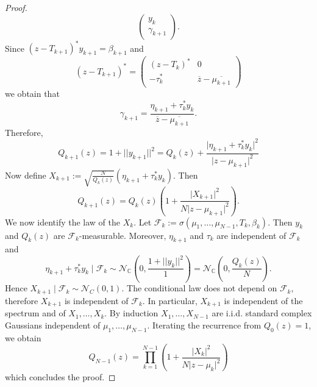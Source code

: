 \documentclass[10pt,a4paper]{amsart}
\newcommand{\C}{\mathbb{C}}
\begin{document}
\begin{proof}
\begin{equation*}
\begin{pmatrix}
        y_k\\
        \gamma_{k+1}
    \end{pmatrix}.
    \end{equation*}
    Since $(z-T_{k+1})^*y_{k+1}=\beta_{k+1}$ and 
    \begin{equation*}
        (z-T_{k+1})^*= \begin{pmatrix}
        (z-T_k)^*&0\\
        -\tau_k^*& \overline{z}-\overline{\mu_{k+1}}
    \end{pmatrix}
    \end{equation*}
    we obtain that 
    \begin{equation*}
        \gamma_{k+1}=\frac{\eta_{k+1}+\tau_k^*y_k}{\overline{z}-\overline{\mu_{k+1}}}.
    \end{equation*}
    Therefore, 
    \begin{equation*}
        Q_{k+1}(z)=1+\lvert \lvert y_{k+1}\lvert \lvert^2=Q_k(z)+ \frac{\lvert \eta_{k+1}+\tau_k^*y_k\lvert^2}{\lvert z-\mu_{k+1}\lvert^2}
    \end{equation*}
    Now define $X_{k+1}:=\sqrt{\frac{N}{Q_k(z)}}(\eta_{k+1}+\tau_k^*y_k).$ Then 
    \begin{equation*}
        Q_{k+1}(z)=Q_k(z)\left(1+ \frac{\lvert X_{k+1}\lvert^2}{N\lvert z-\mu_{k+1}\lvert^2}\right).
    \end{equation*}
    We now identify the law of the $X_k$. Let $\mathcal{F}_k:=\sigma(\mu_1,\ldots,\mu_{N-1},T_k,\beta_k).$ Then $y_k$ and $Q_k(z)$ are $\mathcal{F}_k$-measurable. Moreover, $\eta_{k+1}$ and $\tau_k$ are independent of $\mathcal{F}_k$ and 
    \begin{equation*}
        \eta_{k+1}+\tau_k^*y_k \mid \mathcal{F}_k \sim \mathcal{N}_{\C}\left(0,\frac{1+\lvert \lvert y_k \lvert \lvert^2}{1}\right)=\mathcal{N}_{\C}\left(0,\frac{Q_k(z)}{N}\right).
    \end{equation*}
    Hence $X_{k+1}\mid \mathcal{F}_k \sim \mathcal{N}_{C}(0,1).$ The conditional law does not depend on $\mathcal{F}_k$, therefore $X_{k+1}$ is independent of $\mathcal{F}_k$. In particular, $X_{k+1}$ is independent of the spectrum and of $X_1,\ldots,X_k$. By induction $X_1,\ldots,X_{N-1}$ are i.i.d. standard complex Gaussians independent of $\mu_1,\ldots,\mu_{N-1}$. Iterating the recurrence from $Q_0(z)=1$, we obtain 
    \begin{equation*}
        Q_{N-1}(z)=\prod_{k=1}^{N-1}\left(1+\frac{\lvert X_k \lvert ^2}{N\lvert z-\mu_k \lvert^2}\right)
    \end{equation*}
    which concludes the proof.
\end{proof}
\end{document}
